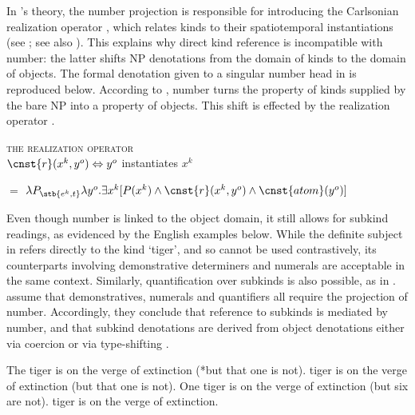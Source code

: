 \documentclass[output=paper,
colorlinks,
citecolor=brown,
newtxmath
]{langscibook}
\begin{document}
\noindent
In \citeauthor{Borik.Espinal2012}'s theory, the number projection is responsible for introducing the Carlsonian realization operator , which relates kinds to their spatiotemporal instantiations (see ; see also \citealt{Carlson1977}). This explains why direct kind reference is incompatible with number: the latter shifts NP denotations from the domain of kinds to the domain of objects. The formal denotation given to a singular number head in \citet{Borik.Espinal2015} is reproduced below. According to , number turns the property of kinds supplied by the bare NP into a property of objects. This shift is effected by the realization operator .

\ea \textsc{the realization operator}\label{def:realization_operator}\\
    $\cnst{r}(x^k, y^o) \Leftrightarrow y^o$ instantiates $x^k$
\z




\ea {} $=$ $\lambda P_{\stb{e^k,t}}\lambda y^o.\exists x^k [P(x^k) \wedge \cnst{r}(x^k, y^o) \wedge \cnst{atom}(y^o)]$ \label{ex:number}
\z


\noindent
Even though number is linked to the object domain, it still allows for subkind readings, as evidenced by the English examples below. While the definite subject in  refers directly to the kind `tiger', and so cannot be used contrastively, its counterparts involving demonstrative determiners  and numerals  are acceptable in the same context. Similarly, quantification over subkinds is also possible, as in . \citeauthor{Borik.Espinal2012} assume that demonstratives, numerals and quantifiers all require the projection of number. Accordingly, they conclude that reference to subkinds is mediated by number, and that subkind denotations are derived from object denotations either via coercion \citep{Borik.Espinal2012} or via type-shifting \citep{Borik.Espinal2015}.

\ea
\ea The tiger is on the verge of extinction (*but that one is not). \label{ex:tiger-kind}
 tiger is on the verge of extinction (but that one is not). \label{ex:tiger-dem}
\ex One tiger is on the verge of extinction (but six are not). \label{ex:tiger-num}
 tiger is on the verge of extinction.
\label{ex:tiger-quant}
\z \z
\end{document}
